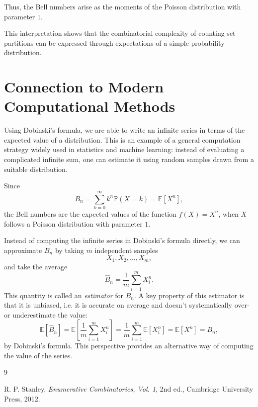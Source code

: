 \documentclass[12pt]{amsart}
\theoremstyle{plain}
\theoremstyle{definition}
\theoremstyle{remark}
\newcommand{\PP}{\mathbb{P}}
\newcommand{\EE}{\mathbb{E}}
\begin{document}
Thus, the Bell numbers arise as the moments of the Poisson distribution with parameter $1$.

This interpretation shows that the combinatorial complexity of counting set partitions can be expressed through expectations of a simple probability distribution.

\section{Connection to Modern Computational Methods}

Using Dobinski's formula, we are able to write an infinite series in terms of the expected value of a distribution. This is an example of a general computation strategy widely used in statistics and machine learning: instead of evaluating a complicated infinite sum, one can estimate it using random samples drawn from a suitable distribution.

Since
$$B_n = \sum_{k = 0}^\infty k^n \PP(X = k) = \EE[X^n],$$
the Bell numbers are the expected values of the function $f(X) = X^n$, when $X$ follows a Poisson distribution with parameter $1$.

Instead of computing the infinite series in Dobinski's formula directly, we can approximate $B_n$ by taking $m$ independent samples
$$X_1, X_2, \ldots, X_m,$$
and take the average
$$\widehat{B}_n = \frac{1}{m}\sum_{i = 1}^m X_i^n.$$
This quantity is called an \emph{estimator} for $B_n$. A key property of this estimator is that it is unbiased, i.e. it is accurate on average and doesn't systematically over- or underestimate the value:
$$\EE[\widehat{B}_n] = \EE\left[\frac{1}{m}\sum_{i = 1}^m X_i^n\right] = \frac{1}{m}\sum_{i = 1}^m \EE[X_i^n] = \EE[X^n] = B_n,$$
by Dobinski's formula. This perspective provides an alternative way of computing the value of the series.

\begin{thebibliography}{9}

R. P. Stanley,
\textit{Enumerative Combinatorics, Vol. 1},
2nd ed., Cambridge University Press, 2012.

\end{thebibliography}
\end{document}
